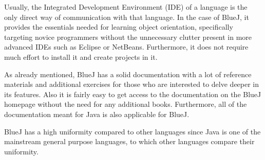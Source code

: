 \begin{description}[style=nextline]
\item[Environment]
Usually, the Integrated Development Environment (IDE) of a language is the only direct way of communication with that language. In the case of BlueJ, it provides the essentials needed for learning object orientation, specifically targeting novice programmers without the unnecessary clutter present in more advanced IDEs such as Eclipse or NetBeans. Furthermore, it does not require much effort to install it and create projects in it.
\item[Documentation]
As already mentioned, BlueJ has a solid documentation with a lot of reference materials and additional exercises for those who are interested to delve deeper in its features. Also it is fairly easy to get access to the documentation on the BlueJ homepage without the need for any additional books. Furthermore, all of the documentation meant for Java is also applicable for BlueJ.
\item[Uniformity]
BlueJ has a high uniformity compared to other languages since Java is one of the mainstream general purpose languages, to which other languages compare their uniformity.
\end{description}